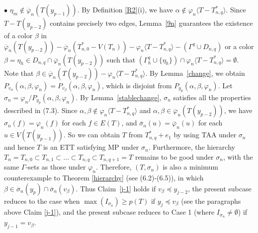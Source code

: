 \documentclass[11pt]{article}
\newcommand{\phibar}{\overline{\varphi}}
\begin{document}
$\bullet$ $\eta_m\notin\phibar_n(T(y_{p-1}))$. By Definition \ref{R2}(i), we have $\alpha \notin\varphi_n
\langle T-T_{n,q}^* \rangle$. Since $T-T(y_{p-2})$ contains precisely two edges, Lemma~\ref{9n} guarantees
the existence of a color $\beta$ in $\overline{\varphi}_n(T(y_{p-2}))- \phibar_n(T_{n,0}^*-V(T_n)) - \varphi_n 
\langle T - T_{n,q}^* \rangle -(\Gamma^{q}\cup D_{n,q} )$ or a color $\beta=\eta_{h}\in D_{n,q}\cap 
\phibar_n(T(y_{p-2}))$ such that $(\Gamma^{q}_h \cup \{\eta_{h}\}) \cap \varphi_n \langle T - T_{n,q}^* 
\rangle=\emptyset$. Note that $\beta \in \overline{\varphi}_n(T(y_{p-2}))-\varphi_n \langle T - 
T_{n,q}^* \rangle$. By  Lemma~\ref{change}, we obtain $P_{v_{\alpha}} (\alpha, \beta, \varphi_n) = 
P_{v_{\beta}}(\alpha, \beta, \varphi_n)$, which is disjoint from $P_{y_p}(\alpha, \beta, \varphi_n)$.  Let $\sigma_n=\varphi_n/P_{y_p}(\alpha, \beta, \varphi_n)$. By Lemma~\ref{stablechange},  $\sigma_n$ satisfies all 
the properties described in (7.3). Since $\alpha, \beta \notin\varphi_n \langle T-T_{n,q}^* \rangle$
and $\alpha, \beta\in \phibar_n(T(y_{p-2}))$, we have $\sigma_n(f)=\varphi_n(f)$ 
for each $f\in E(T)$, and $\overline{\sigma}_n(u)=\overline{\varphi}_n(u)$ for each $u\in V(T(y_{p-1}))$.  
So we can obtain $T$ from $T_{n,q}^*+e_1$ by using TAA under $\sigma_n$ and hence $T$ is an ETT satisfying MP under $\sigma_n$. 
Furthermore, the hierarchy $T_n=T_{n,0} \subset T_{n,1} \subset \ldots \subset T_{n,q} \subset T_{n,q+1}=T$ remains 
to be good under $\sigma_n$, with the same $\Gamma$-sets as those under $\varphi_n$. Therefore, $(T, \sigma_n)$ is 
also a minimum counterexample to Theorem \ref{hierarchy} (see (6.2)-(6.5)), in which $\beta \in \overline{\sigma}_n(y_p)\cap 
\overline{\sigma}_n(v_{\beta})$. Thus Claim~\ref{j-1} holds if $v_{\beta}\preceq y_{j-2}$, the present subcase
reduces to the case when $\max(I_{\sigma_n}) \ge p(T)$ if $y_j \preceq v_{\beta}$ (see the paragraphs above
Claim \ref{j-1}), and the present subcase reduces to Case 1 (where $I_{\sigma_n}\neq \emptyset$) if $y_{j-1}=v_{\beta}$.
 
\end{document}
